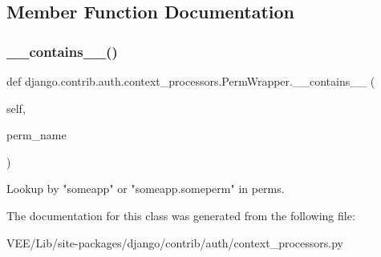 \subsection{Member Function Documentation}
\mbox{\label{classdjango_1_1contrib_1_1auth_1_1context__processors_1_1_perm_wrapper_aa302f9086e35c2330906c83ede2501ef}} 
\subsubsection{\texorpdfstring{\+\_\+\+\_\+contains\+\_\+\+\_\+()}{\_\_contains\_\_()}}
{\footnotesize\ttfamily def django.\+contrib.\+auth.\+context\+\_\+processors.\+Perm\+Wrapper.\+\_\+\+\_\+contains\+\_\+\+\_\+ (\begin{DoxyParamCaption}\item[{}]{self,  }\item[{}]{perm\+\_\+name }\end{DoxyParamCaption})}

\begin{DoxyVerb}Lookup by "someapp" or "someapp.someperm" in perms.
\end{DoxyVerb}
 

The documentation for this class was generated from the following file\+:\begin{DoxyCompactItemize}
\item 
V\+E\+E/\+Lib/site-\/packages/django/contrib/auth/context\+\_\+processors.\+py\end{DoxyCompactItemize}
